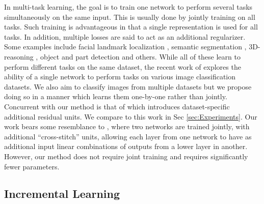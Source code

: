 \documentclass[10pt,journal,compsoc]{IEEEtran}
\begin{document}
In multi-task learning, the goal is to train one network to perform
several tasks simultaneously on the same input. This is usually done
by jointly training on all tasks. Such training is advantageous in
that a single representation is used for all tasks. In addition, multiple
losses are said to act as an additional regularizer. Some examples
include facial landmark localization \cite{conf/cvpr/ZhuLLT15}, semantic
segmentation \cite{he2017mask}, 3D-reasoning \cite{eigen2015predicting},
object and part detection \cite{bilen16integrated} and others. While
all of these learn to perform different tasks on the same dataset,
the recent work of \cite{1701.07275} explores the ability of a single
network to perform tasks on various image classification datasets.
We also aim to classify images from multiple datasets but we propose
doing so in a manner which learns them one-by-one rather than jointly.
Concurrent with our method is that of \cite{rebuffi2017learning}
which introduces dataset-specific additional residual units. We compare
to this work in Sec \ref{sec:Experiments}. Our work bears some resemblance
to \cite{journals/corr/MisraSGH16}, where two networks are trained
jointly, with additional ``cross-stitch'' units, allowing each layer
from one network to have as additional input linear combinations of
outputs from a lower layer in another. However, our method does not
require joint training and requires significantly fewer parameters. 

\subsection{Incremental Learning}
\end{document}
